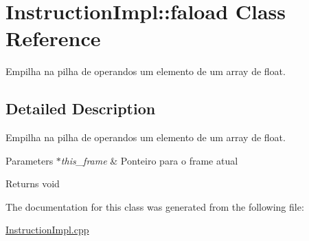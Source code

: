 \hypertarget{class_instruction_impl_1_1faload}{}\section{Instruction\+Impl\+:\+:faload Class Reference}
\label{class_instruction_impl_1_1faload}


Empilha na pilha de operandos um elemento de um array de float.  




\subsection{Detailed Description}
Empilha na pilha de operandos um elemento de um array de float. 


\begin{DoxyParams}{Parameters}
{\em $\ast$this\+\_\+frame} & Ponteiro para o frame atual \\
\hline
\end{DoxyParams}
\begin{DoxyReturn}{Returns}
void 
\end{DoxyReturn}


The documentation for this class was generated from the following file\+:\begin{DoxyCompactItemize}
\item 
\hyperlink{_instruction_impl_8cpp}{Instruction\+Impl.\+cpp}\end{DoxyCompactItemize}
